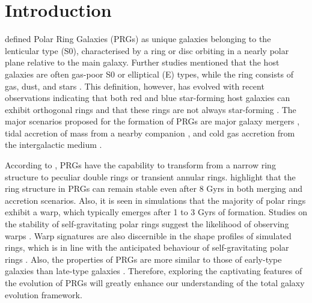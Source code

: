 \documentclass{pas}
\begin{document}
\section{Introduction}
\cite{whitmore1990} defined Polar Ring Galaxies (PRGs) as unique galaxies belonging to the lenticular type (S0), characterised by a ring or disc orbiting in a nearly polar plane relative to the main galaxy. Further studies mentioned that the host galaxies are often gas-poor S0 or elliptical (E) types, while the ring consists of gas, dust, and stars \citep{reshkinov1997,finkelman2012}. This definition, however, has evolved with recent observations indicating that both red and blue star-forming host galaxies can exhibit orthogonal rings \citep{2015Reshetnikovandcombes} and that these rings are not always star-forming \citep{2023Degwallaby}. The major scenarios proposed for the formation of PRGs are major galaxy mergers \citep{1998Bekki,2003Bournaud_Combes}, tidal accretion of mass from a nearby companion \citep{reshkinov1997,2003Bournaud_Combes}, and cold gas accretion from the intergalactic medium \citep{2008ApJ...689..678B}.\par
According to \cite{1998Bekki}, PRGs have the capability to transform from a narrow ring structure to peculiar double rings or transient annular rings. \citet{2003Bournaud_Combes} highlight that the ring structure in PRGs can remain stable even after 8 Gyrs in both merging and accretion scenarios. Also, it is {seen in simulations} that the majority of polar rings exhibit a warp, which typically emerges after 1 to 3 Gyrs of formation. Studies on the stability of self-gravitating polar rings suggest the likelihood of observing warps \citep{1994Arnaboldisparke,2009Sparke}. Warp signatures are also discernible in the shape profiles of simulated rings, which is in line with the anticipated behaviour of self-gravitating polar rings \citep{2024Smirnov}. Also, the properties of PRGs are more similar to those of early-type galaxies than late-type galaxies \citep{whitmore1990,2024akr_2}. Therefore, exploring the captivating features of the evolution of PRGs will greatly enhance our understanding of the total galaxy evolution framework. \par 
\end{document}
